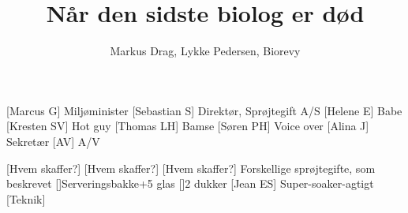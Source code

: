 \documentclass[a4paper,12pt]{article}
\title{Når den sidste biolog er død}
\author{Markus Drag, Lykke Pedersen, Biorevy}
\begin{document}
\maketitle

\begin{texxers}
\end{texxers}

\begin{roles}
	[Marcus G] Miljøminister
	[Sebastian S] Direktør, Sprøjtegift A/S
	[Helene E] Babe
	[Kresten SV] Hot guy
    [Thomas LH] Bamse
	[Søren PH] Voice over
	[Alina J] Sekretær
	[AV] A/V
\end{roles}


\begin{props}
	[Hvem skaffer?] 
	[Hvem skaffer?] 
	[Hvem skaffer?] Forskellige sprøjtegifte, som beskrevet
	[]Serveringsbakke+5 glas
	[]2 dukker
	[Jean ES] Super-soaker-agtigt
	[Teknik]
\end{props}
\end{document}
